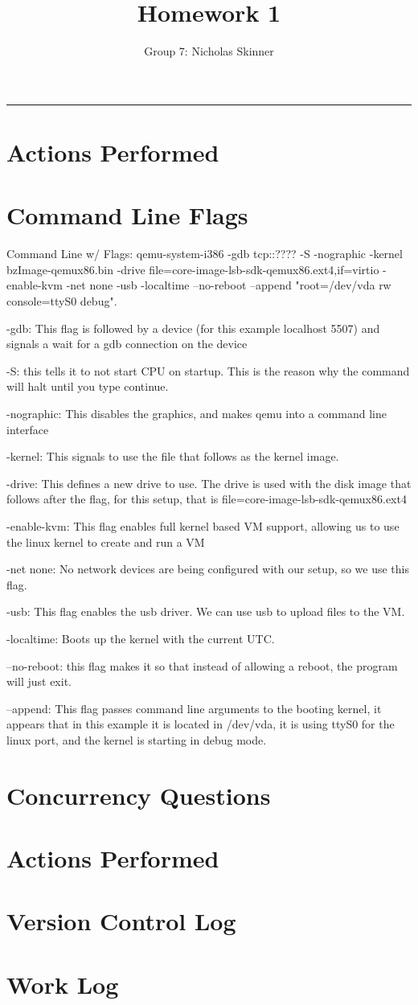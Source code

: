 \documentclass[letterpaper,10pt,fleqn]{article}
\title{Homework 1}
\author{Group 7: Nicholas Skinner}
\begin{document}
	\maketitle
	\hrule
	
	\section*{Actions Performed}

	\section*{Command Line Flags}
	Command Line w/ Flags:
	qemu-system-i386 -gdb tcp::???? -S -nographic -kernel bzImage-qemux86.bin -drive file=core-image-lsb-sdk-qemux86.ext4,if=virtio -enable-kvm -net none -usb -localtime --no-reboot --append "root=/dev/vda rw console=ttyS0 debug".
	
	-gdb: This flag is followed by a device (for this example localhost 5507) and signals a wait for a gdb connection on the device
	
	-S: this tells it to not start CPU on startup. This is the reason why the command will halt until you type continue.
	
	-nographic: This disables the graphics, and makes qemu into a command line interface
	
	-kernel: This signals to use the file that follows as the kernel image. 
	
	-drive: This defines a new drive to use. The drive is used with the disk image that follows after the flag, for this setup, that is file=core-image-lsb-sdk-qemux86.ext4
	
	-enable-kvm: This flag enables full kernel based VM support, allowing us to use the linux kernel to create and run a VM
	
	-net none: No network devices are being configured with our setup, so we use this flag.
	
	-usb: This flag enables the usb driver. We can use usb to upload files to the VM. 
	
	-localtime: Boots up the kernel with the current UTC.
	
	--no-reboot: this flag makes it so that instead of allowing a reboot, the program will just exit.
	
	--append: This flag passes command line arguments to the booting kernel, it appears that in this example it is located in /dev/vda, it is using ttyS0 for the linux port, and the kernel is starting in debug mode.
	
	\section*{Concurrency Questions}
	
	\section*{Actions Performed}
	
	\section*{Version Control Log}
	
	\section*{Work Log}
\end{document}
